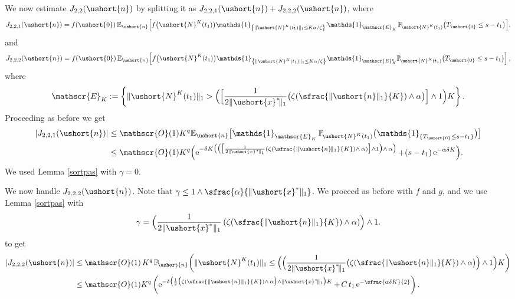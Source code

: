 \documentclass[JEP,XML,SOM,Unicode]{cedram}
\newcommand{\Psfrac}[2]{(\sfrac{#1}{#2})}
\let\mathcal\mathscr
\numberwithin{equation}{section}
\theoremstyle{plain}
\theoremstyle{definition}
\newcommand{\proba}{{\mathbb{P}}}
\newcommand{\E}{{\mathbb{E}}}
\newcommand{\Oun}{\mathcal{O}(1)}
\newcommand{\un}{\mathds{1}}
\newcommand{\vecn}{\ushort{n}}
\newcommand{\vecxf}{\ushort{x}^*}
\newcommand{\svecxf}{\ushort{x}^*}
\newcommand{\veczer}{\ushort{0}}
\newcommand{\leproc}{\ushort{N}^{K}}
\newcommand{\sleproc}{\ushort{N}^{K}}
\newcommand{\e}{\operatorname{e}}
\newcommand{\norm}[1]{\|#1\|_{1}}\let\snorm\norm
\begin{document}
We now estimate $J_{2,2}(\vecn)$ by splitting it as
$J_{2,2,1}(\vecn)+J_{2,2,2}(\vecn)$, where
\[
J_{2,2,1}(\vecn)=f(\veczer)\,\E_{\vecn}\Bigl[f\bigl(\leproc(t_{1})\bigr) \un_{\left\{\|\leproc(t_1)\|_1\leq K\alpha/\zeta\right\}} \,
\un_{\mathcal{E}_K}\,\proba_{\!\sleproc(t_{1}) } \bigl(T_{\veczer} \leq s-t_1\bigr)\Bigr].
\]
and
\[
J_{2,2,2}(\vecn)= f(\veczer)\,
\E_{\vecn}\!\left[
f\bigl(\leproc(t_{1})\bigr) \un_{\left\{\|\leproc(t_1)\|_1\leq K\alpha/\zeta\right\}}
\un_{\mathcal{E}_K^c}\proba_{\!\sleproc(t_{1}) } \bigl(T_{\veczer} \leq s-t_1\bigr)\right],
\]
where
\[
\mathcal{E}_K:=\left\{\|\leproc(t_1)\|_1 > \Bigl(\Bigl[\frac{1}{2\|\vecxf\!\|_1}
\bigl(\zeta\Psfrac{\norm{\vecn}}{K}\wedge \alpha\bigr)\Bigr]\wedge 1\Bigr){K}\right\}.
\]
Proceeding as before we get
\begin{align*}
|J_{2,2,1}(\vecn)|
& \leq \Oun K^{q}\E_{\vecn}\bigl[
\un_{\mathcal{E}_K}\,\proba_{\!\sleproc(t_{1}) } \bigl(\un_{\{T_{\veczer} \leq s-t_1\}}\bigr)\bigr]\\
& \leq \Oun K^{q}
\Bigl(\e^{-\delta K \bigl(\bigl(\bigl[\frac{1}{2\|\svecxf\!\|_{1}}(\zeta\Psfrac{\|\vecn\!\|_{1}}{K}\wedge\, \alpha)\bigr]\wedge 1\bigr)\wedge\, \alpha \bigr)}+(s-t_1) \e^{-\alpha\delta K}\Bigr).
\end{align*}
We used Lemma \ref{sortpas} with $\gamma=0$.

We now handle $J_{2,2,2}(\vecn)$. Note that $\gamma\leq 1\wedge \sfrac{\alpha}{\|\vecxf\|_{1}}$.
We proceed as before with $f$ and $g$, and we use Lemma \ref{sortpas} with
\[
\gamma= \Bigl(\frac{1}{2\|\vecxf\|_1} \left(\zeta\Psfrac{\|\vecn\|_1}{K}\wedge \alpha\right) \Bigr)\wedge 1.
\]
to get
\begin{align*}
|J_{2,2,2}(\vecn)|
& \leq \Oun\, K^{q}\,\proba_{\!\vecn} \biggl(
\|\leproc(t_1)\|_1 \le \Bigl(\Bigl(\frac{1}{2\|\vecxf\!\|_1}
\bigl(\zeta\Psfrac{\norm{\vecn}}{K}\wedge \alpha\bigr) \Bigr)\wedge 1 \Bigr){K} \biggr)\\
& \leq \Oun K^q
\left(\e^{-{\delta} \bigl(\frac{1}{2} \bigl(\zeta\Psfrac{\|\vecn\|_{1}}{K}\wedge\, \alpha\bigr)\wedge \|\vecxf\!\|_1\bigr)K}
+\, C\, t_1 \e^{-\sfrac{\alpha\delta K}{2}}\right).
\end{align*}
\end{document}
